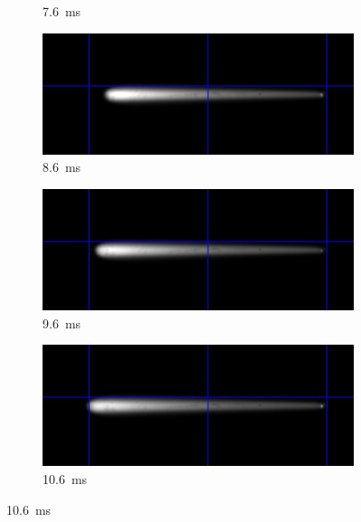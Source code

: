 \begin{figure}[h]
\begin{subfigure}[t]{0.47\textwidth}
        \caption{\qty{7.6}{ms}}
        \label{fig:growth_frames_76}
    \end{subfigure}
    \hfill
    \begin{subfigure}[t]{0.47\textwidth}
        \centering
        \includegraphics[width=\textwidth]{assets/5 results/1msFrames/86.jpg}
        \caption{\qty{8.6}{ms}}
        \label{fig:growth_frames_86}
    \end{subfigure}
    \hfill
    \begin{subfigure}[t]{0.47\textwidth}
        \centering
        \includegraphics[width=\textwidth]{assets/5 results/1msFrames/96.jpg}
        \caption{\qty{9.6}{ms}}
        \label{fig:growth_frames_96}
    \end{subfigure}
    \hfill
    \begin{subfigure}[t]{0.47\textwidth}
        \centering
        \includegraphics[width=\textwidth]{assets/5 results/1msFrames/106.jpg}
        \caption{\qty{10.6}{ms}}
        \label{fig:growth_frames_106}
    \end{subfigure}

\end{figure}
